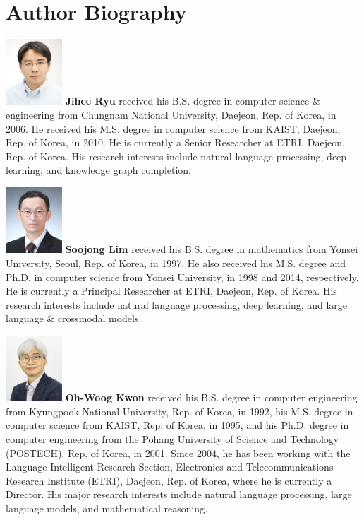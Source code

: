 \documentclass[AMS,STIX2COL]{WileyNJD-v2}
\begin{document}
    


    \section*{Author Biography}

    \begin{biography}
    {\includegraphics[width=60pt,height=70pt]{author1}}
    {\textbf{Jihee Ryu} received his B.S. degree in computer science \& engineering from Chungnam National University, Daejeon, Rep. of Korea, in 2006. He received his M.S. degree in computer science from KAIST, Daejeon, Rep. of Korea, in 2010. He is currently a Senior Researcher at ETRI, Daejeon, Rep. of Korea. His research interests include natural language processing, deep learning, and knowledge graph completion.}
    \end{biography}

    \begin{biography}
    {\includegraphics[width=60pt,height=70pt]{author2}}
    {\textbf{Soojong Lim} received his B.S. degree in mathematics from Yonsei University, Seoul, Rep. of Korea, in 1997. He also received his M.S. degree and Ph.D. in computer science from Yonsei University, in 1998 and 2014, respectively. He is currently a Principal Researcher at ETRI, Daejeon, Rep. of Korea. His research interests include natural language processing, deep learning, and large language \& crossmodal models.}
    \end{biography}

    \begin{biography}
    {\includegraphics[width=60pt,height=70pt]{author3}}
    {\textbf{Oh-Woog Kwon} received his B.S. degree in computer engineering from Kyungpook National University, Rep. of Korea, in 1992, his M.S. degree in computer science from KAIST, Rep. of Korea, in 1995, and his Ph.D. degree in computer engineering from the Pohang University of Science and Technology (POSTECH), Rep. of Korea, in 2001. Since 2004, he has been working with the Language Intelligent Research Section, Electronics and Telecommunications Research Institute (ETRI), Daejeon, Rep. of Korea, where he is currently a Director. His major research interests include natural language processing, large language models, and mathematical reasoning.}
    \end{biography}
\end{document}
